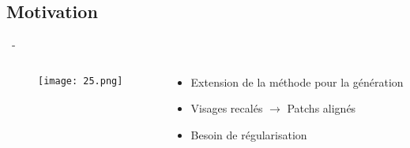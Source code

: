 \documentclass[aspectratio=169, 22pt]{beamer}
\begin{document}
\subsection{Motivation}
\begin{frame}{\secname~- \subsecname}
  \begin{columns}
    \begin{column}{0.3\linewidth}
      \begin{figure}
        \centering
        \texttt{[image: 25.png]}
      \end{figure}
    \end{column}
    \begin{column}{0.7\linewidth}
      \begin{itemize}
      \item Extension de la méthode pour la génération
      \item Visages recalés $\rightarrow$ Patchs alignés
        \vspace{1em}
      \item Besoin de \alert{régularisation}
      \end{itemize}
    \end{column}
  \end{columns}
\end{frame}
\end{document}
